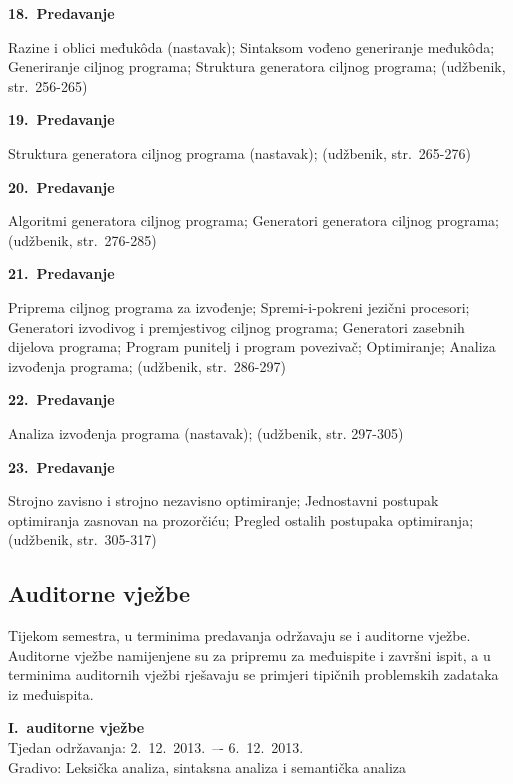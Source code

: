 \documentclass[times, 12pt, utf8]{book}
\newenvironment{myindentpar}[1]%
{\begin{list}{}%
         {\setlength{\leftmargin}{#1}}%
         \item[]%
}
{\end{list}}
\begin{document}
\textbf{18.~Predavanje}
\begin{myindentpar}{30pt}
Razine i oblici međukôda (nastavak); Sintaksom vođeno generiranje međukôda; Generiranje ciljnog programa; Struktura generatora ciljnog programa; (udžbenik, str.~256-265)
\end{myindentpar}

\textbf{19.~Predavanje}
\begin{myindentpar}{30pt}
Struktura generatora ciljnog programa (nastavak); (udžbenik, str.~265-276) 
\end{myindentpar}

\textbf{20.~Predavanje}
\begin{myindentpar}{30pt}
Algoritmi generatora ciljnog programa; Generatori generatora ciljnog programa; (udžbenik, str.~276-285) 
\end{myindentpar}

\textbf{21.~Predavanje}
\begin{myindentpar}{30pt}
Priprema ciljnog programa za izvođenje; Spremi-i-pokreni jezični procesori; Generatori izvodivog i premjestivog ciljnog programa; Generatori zasebnih dijelova programa; Program punitelj i program povezivač; Optimiranje; Analiza izvođenja programa; (udžbenik, str.~286-297)
\end{myindentpar}

\textbf{22.~Predavanje}
\begin{myindentpar}{30pt}
Analiza izvođenja programa (nastavak); (udžbenik, str. 297-305)
\end{myindentpar}

\textbf{23.~Predavanje}
\begin{myindentpar}{30pt}
Strojno zavisno i strojno nezavisno optimiranje; Jednostavni postupak optimiranja zasnovan na prozorčiću; Pregled ostalih postupaka optimiranja; (udžbenik, str.~305-317)
\end{myindentpar}

\cleardoublepage  
{}  
{}
\subsection*{Auditorne vježbe}

Tijekom semestra, u terminima predavanja održavaju se i auditorne vježbe.
Auditorne vježbe namijenjene su za pripremu za međuispite i završni ispit, a u terminima auditornih vježbi rješavaju se primjeri tipičnih problemskih zadataka iz međuispita.

\textbf{I.~auditorne vježbe} \\
Tjedan održavanja: 2.~12.~2013.~–- 6.~12.~2013. \\
Gradivo: Leksička analiza, sintaksna analiza i semantička analiza
\end{document}

